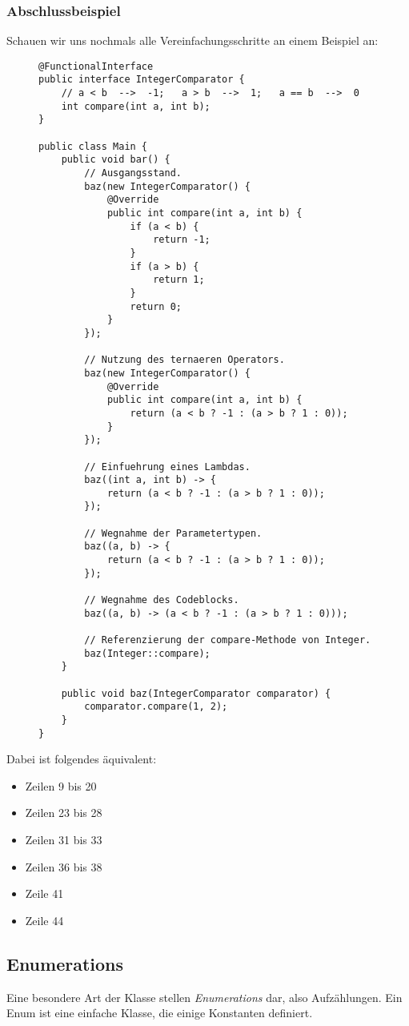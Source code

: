 	\subsubsection{Abschlussbeispiel}
		Schauen wir uns nochmals alle Vereinfachungsschritte an einem Beispiel an:
		\begin{figure}[H]
			\centering
			\begin{lstlisting}
@FunctionalInterface
public interface IntegerComparator {
	// a < b  -->  -1;   a > b  -->  1;   a == b  -->  0
	int compare(int a, int b);
}

public class Main {
	public void bar() {
		// Ausgangsstand.
		baz(new IntegerComparator() {
			@Override
			public int compare(int a, int b) {
				if (a < b) {
					return -1;
				}
				if (a > b) {
					return 1;
				}
				return 0;
			}
		});

		// Nutzung des ternaeren Operators.
		baz(new IntegerComparator() {
			@Override
			public int compare(int a, int b) {
				return (a < b ? -1 : (a > b ? 1 : 0));
			}
		});

		// Einfuehrung eines Lambdas.
		baz((int a, int b) -> {
			return (a < b ? -1 : (a > b ? 1 : 0));
		});

		// Wegnahme der Parametertypen.
		baz((a, b) -> {
			return (a < b ? -1 : (a > b ? 1 : 0));
		});

		// Wegnahme des Codeblocks.
		baz((a, b) -> (a < b ? -1 : (a > b ? 1 : 0)));

		// Referenzierung der compare-Methode von Integer.
		baz(Integer::compare);
	}
	
	public void baz(IntegerComparator comparator) {
		comparator.compare(1, 2);
	}
}
\end{lstlisting}
		\end{figure}
		Dabei ist folgendes äquivalent:
		\begin{itemize}
			\item Zeilen 9 bis 20
			\item Zeilen 23 bis 28
			\item Zeilen 31 bis 33
			\item Zeilen 36 bis 38
			\item Zeile 41
			\item Zeile 44
		\end{itemize}

\subsection{Enumerations}
	Eine besondere Art der Klasse stellen \textit{Enumerations} dar, also Aufzählungen. Ein Enum ist eine einfache Klasse, die einige Konstanten definiert.
	
